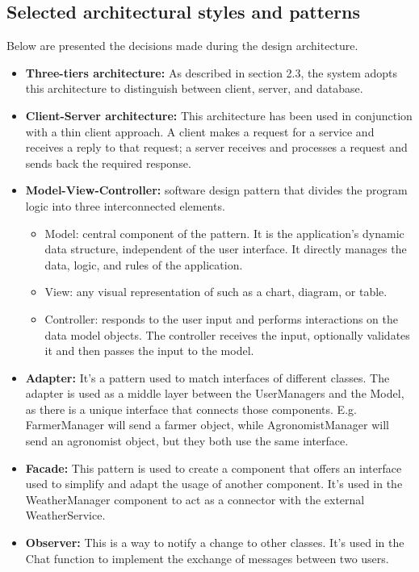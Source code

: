 \subsection{Selected architectural styles and patterns}
Below are presented the decisions made during the design architecture.
\begin{itemize}
    \item \textbf{Three-tiers architecture: }As described in section 2.3, the system adopts this architecture to distinguish between client, server, and database.
    \item \textbf{Client-Server architecture: }This architecture has been used in conjunction with a thin client approach. A client makes a request for a service and receives a reply to that request; a server receives and processes a request and sends back the required response.
    \item \textbf{Model-View-Controller: }software design pattern that divides the program logic into three interconnected elements.
    \begin{itemize}
        \item Model: central component of the pattern. It is the application’s dynamic data structure, independent of the user interface. It directly manages the data, logic, and rules of the application.
        \item View: any visual representation of such as a chart, diagram, or table.
        \item Controller: responds to the user input and performs interactions on the data model objects. The controller receives the input, optionally validates it and then passes the input to the model.
    \end{itemize}
    \item \textbf{Adapter:} It’s a pattern used to match interfaces of different classes. The adapter is used as a middle layer between the UserManagers and the Model, as there is a unique interface that connects those components. E.g. FarmerManager will send a farmer object, while AgronomistManager will send an agronomist object, but they both use the same interface. 
    \item \textbf{Facade: }This pattern is used to create a component that offers an interface used to simplify and adapt the usage of another component. It’s used in the WeatherManager component to act as a connector with the external WeatherService.
    \item \textbf{Observer: }This is a way to notify a change to other classes. It’s used in the Chat function to implement the exchange of messages between two users. 
\end{itemize}
\newpage
